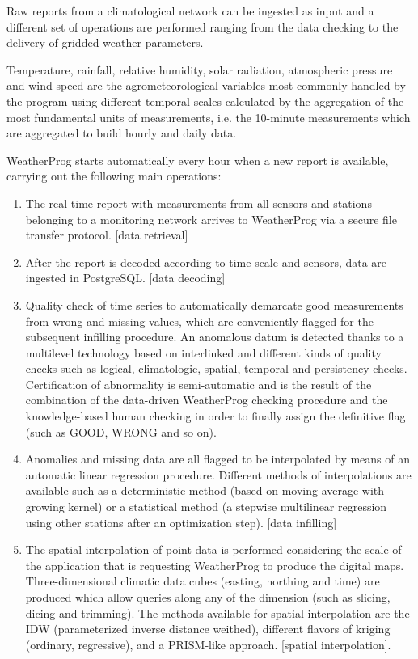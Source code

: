 \documentclass[authoryear,preprint,review,12pt]{elsarticle}
\begin{document}
Raw reports from a climatological network can be ingested as input and a different set of operations are performed ranging from the data checking to the delivery of gridded weather parameters.

Temperature, rainfall, relative humidity, solar radiation, atmospheric pressure and wind speed are the agrometeorological variables most commonly handled by the program using different temporal scales calculated by the aggregation of the most fundamental units of measurements, i.e. the 10-minute  measurements which are aggregated to build hourly and daily data.

WeatherProg starts automatically every hour when a new report is available, carrying out the following main operations:
\begin{enumerate}
    \item The real-time report with measurements from all sensors and stations belonging to a monitoring network arrives to WeatherProg via a secure file transfer protocol. [data retrieval]
    
    \item After the report is decoded according to time scale and sensors, data are ingested in PostgreSQL. [data decoding]

    \item Quality check of time series to automatically demarcate good measurements from wrong and missing values, which are conveniently flagged for the subsequent infilling procedure.
    An anomalous datum is detected thanks to a multilevel technology based on interlinked and different kinds of quality checks such as logical, climatologic, spatial, temporal and persistency checks. Certification of abnormality is semi-automatic and is the result of the combination of the data-driven WeatherProg checking procedure and the knowledge-based human checking in order to finally assign the definitive flag (such as GOOD, WRONG and so on).
    
    \item Anomalies and missing data are all flagged to be interpolated by means of an automatic linear regression procedure.
    Different methods of interpolations are available such as a deterministic method (based on moving average with growing kernel) or a statistical method (a stepwise multilinear regression using other stations after an optimization step). [data infilling]
    
    \item The spatial interpolation of point data is performed considering the scale of the application that is requesting WeatherProg to produce the digital maps.
    Three-dimensional climatic data cubes (easting, northing and time) are produced which allow queries along any of the dimension (such as slicing, dicing and trimming). The methods available for spatial interpolation are the IDW (parameterized inverse distance weithed), different flavors of kriging (ordinary, regressive), and a PRISM-like approach. [spatial interpolation].
\end{enumerate}
\end{document}
